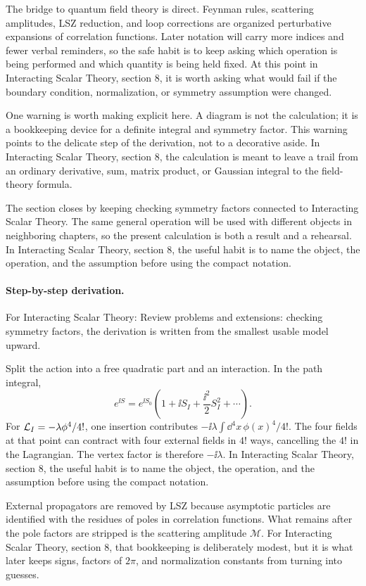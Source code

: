 The bridge to quantum field theory is direct.  Feynman rules, scattering amplitudes, LSZ reduction, and loop corrections are organized perturbative expansions of correlation functions.  Later notation will carry more indices and fewer verbal reminders, so the safe habit is to keep asking which operation is being performed and which quantity is being held fixed.  At this point in Interacting Scalar Theory, section 8, it is worth asking what would fail if the boundary condition, normalization, or symmetry assumption were changed.

One warning is worth making explicit here.  A diagram is not the calculation; it is a bookkeeping device for a definite integral and symmetry factor.  This warning points to the delicate step of the derivation, not to a decorative aside.  In Interacting Scalar Theory, section 8, the calculation is meant to leave a trail from an ordinary derivative, sum, matrix product, or Gaussian integral to the field-theory formula.

The section closes by keeping checking symmetry factors connected to Interacting Scalar Theory.  The same general operation will be used with different objects in neighboring chapters, so the present calculation is both a result and a rehearsal.  In Interacting Scalar Theory, section 8, the useful habit is to name the object, the operation, and the assumption before using the compact notation.



\paragraph{Step-by-step derivation.}

For Interacting Scalar Theory: Review problems and extensions: checking symmetry factors, the derivation is written from the smallest usable model upward.

Split the action into a free quadratic part and an interaction.  In the path integral,
\[
  e^{\ii S}=e^{\ii S_0}\left(1+\ii S_I+\frac{\ii^2}{2}S_I^2+\cdots\right).
\]
For \(\mathcal L_I=-\lambda\phi^4/4!\), one insertion contributes \(-\ii\lambda\int\dd^4x\,\phi(x)^4/4!\).  The four fields at that point can contract with four external fields in \(4!\) ways, cancelling the \(4!\) in the Lagrangian.  The vertex factor is therefore \(-\ii\lambda\).  In Interacting Scalar Theory, section 8, the useful habit is to name the object, the operation, and the assumption before using the compact notation.

External propagators are removed by LSZ because asymptotic particles are identified with the residues of poles in correlation functions.  What remains after the pole factors are stripped is the scattering amplitude \(\mathcal M\).  For Interacting Scalar Theory, section 8, that bookkeeping is deliberately modest, but it is what later keeps signs, factors of \(2\pi\), and normalization constants from turning into guesses.

